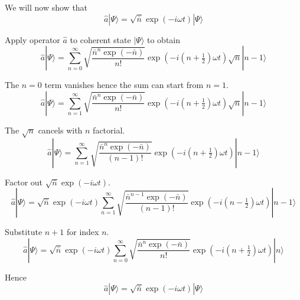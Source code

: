 \documentclass[12pt]{article}
\begin{document}
We will now show that
\begin{equation*}
\hat a|\Psi\rangle=\sqrt{\bar n}\exp(-i\omega t)|\Psi\rangle
\end{equation*}

Apply operator $\hat a$ to coherent state $|\Psi\rangle$ to obtain
\begin{equation*}
\hat a|\Psi\rangle
=\sum_{n=0}^\infty
\sqrt{\frac{\bar n^n\exp(-\bar n)}{n!}}
\exp\left(-i\left(n+\tfrac{1}{2}\right)\omega t\right)
\sqrt n|n-1\rangle
\end{equation*}

The $n=0$ term vanishes hence the sum can start from $n=1$.
\begin{equation*}
\hat a|\Psi\rangle
=\sum_{n=1}^\infty
\sqrt{\frac{\bar n^n\exp(-\bar n)}{n!}}
\exp\left(-i\left(n+\tfrac{1}{2}\right)\omega t\right)
\sqrt n|n-1\rangle
\end{equation*}

The $\sqrt n$ cancels with $n$ factorial.
\begin{equation*}
\hat a|\Psi\rangle
=\sum_{n=1}^\infty
\sqrt{\frac{\bar n^n\exp(-\bar n)}{(n-1)!}}
\exp\left(-i\left(n+\tfrac{1}{2}\right)\omega t\right)
|n-1\rangle
\end{equation*}

Factor out $\sqrt{\bar n}\exp(-i\omega t)$.
\begin{equation*}
\hat a|\Psi\rangle
=\sqrt{\bar n}\exp(-i\omega t)
\sum_{n=1}^\infty
\sqrt{\frac{\bar n^{n-1}\exp(-\bar n)}{(n-1)!}}
\exp\left(-i\left(n-\tfrac{1}{2}\right)\omega t\right)
|n-1\rangle
\end{equation*}

Substitute $n+1$ for index $n$.
\begin{equation*}
\hat a|\Psi\rangle
=\sqrt{\bar n}\exp(-i\omega t)
\sum_{n=0}^\infty
\sqrt{\frac{\bar n^n\exp(-\bar n)}{n!}}
\exp\left(-i\left(n+\tfrac{1}{2}\right)\omega t\right)
|n\rangle
\end{equation*}

Hence
\begin{equation*}
\hat a|\Psi\rangle=\sqrt{\bar n}\exp(-i\omega t)|\Psi\rangle
\end{equation*}
\end{document}
